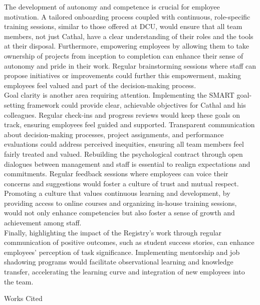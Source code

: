 \documentclass[12pt]{article}
\newenvironment{workscited}{\newpage \begin{center} Works Cited \end{center}}{\newpage }
\begin{document}
\begin{flushleft}
The development of autonomy and competence is crucial for employee motivation. A tailored onboarding process coupled with continuous, role-specific training sessions, similar to those offered at DCU, would ensure that all team members, not just Cathal, have a clear understanding of their roles and the tools at their disposal. Furthermore, empowering employees by allowing them to take ownership of projects from inception to completion can enhance their sense of autonomy and pride in their work. Regular brainstorming sessions where staff can propose initiatives or improvements could further this empowerment, making employees feel valued and part of the decision-making process. \\
Goal clarity is another area requiring attention. Implementing the SMART goal-setting framework could provide clear, achievable objectives for Cathal and his colleagues. Regular check-ins and progress reviews would keep these goals on track, ensuring employees feel guided and supported. Transparent communication about decision-making processes, project assignments, and performance evaluations could address perceived inequities, ensuring all team members feel fairly treated and valued.
Rebuilding the psychological contract through open dialogues between management and staff is essential to realign expectations and commitments. Regular feedback sessions where employees can voice their concerns and suggestions would foster a culture of trust and mutual respect. Promoting a culture that values continuous learning and development, by providing access to online courses and organizing in-house training sessions, would not only enhance competencies but also foster a sense of growth and achievement among staff. \\
Finally, highlighting the impact of the Registry's work through regular communication of positive outcomes, such as student success stories, can enhance employees' perception of task significance. Implementing mentorship and job shadowing programs would facilitate observational learning and knowledge transfer, accelerating the learning curve and integration of new employees into the team. 
















\begin{workscited}


\end{workscited}
\end{flushleft}
\end{document}
